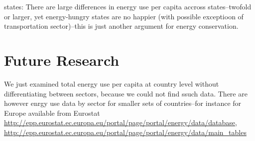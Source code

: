 \documentclass[10pt, letterpaper]{article}
\begin{document}
\begin{spacing}{1.4}


states:
There are large differences in energy use per capita accross states--twofold or
larger, yet energy-hungry states are no happier (with possible exceptioon of
transportation sector)--this is just another argument for energy conservation.

\section{Future Research}

We just examined total energy use per capita at country level without
differentiating between sectors, because we could not find ssuch data. There are
however enrgy use data by sector for smaller sets of countries--for instance for
Europe available from Eurostat
\url{http://epp.eurostat.ec.europa.eu/portal/page/portal/energy/data/database}, \url{http://epp.eurostat.ec.europa.eu/portal/page/portal/energy/data/main_tables} 




\newpage


\end{spacing}
\end{document}
